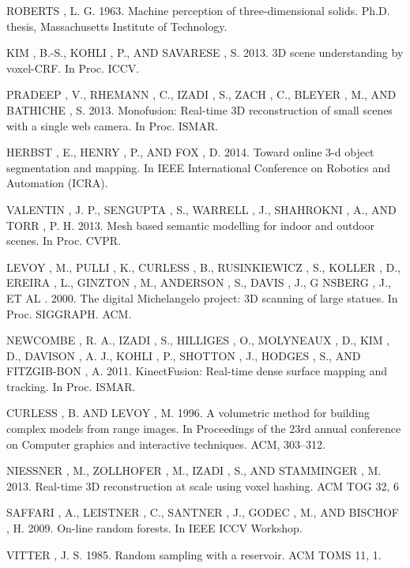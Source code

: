 \documentclass{llncs}
\begin{document}

\begin{thebibliography}{1}

  ROBERTS , L. G. 1963. Machine perception of three-dimensional solids. Ph.D. thesis, Massachusetts Institute of Technology.

  KIM , B.-S., KOHLI , P., AND SAVARESE , S. 2013. 3D scene understanding by voxel-CRF. In Proc. ICCV.

  PRADEEP , V., RHEMANN , C., IZADI , S., ZACH , C., BLEYER , M., AND BATHICHE , S. 2013. Monofusion: Real-time 3D reconstruction of small scenes with a single web camera. In Proc. ISMAR.

  HERBST , E., HENRY , P., AND FOX , D. 2014. Toward online 3-d object segmentation and mapping. In IEEE International Conference on Robotics and Automation (ICRA).

  VALENTIN , J. P., SENGUPTA , S., WARRELL , J., SHAHROKNI , A., AND TORR , P. H. 2013. Mesh based semantic modelling for indoor and outdoor scenes. In Proc. CVPR.

  LEVOY , M., PULLI , K., CURLESS , B., RUSINKIEWICZ , S., KOLLER , D., EREIRA , L., GINZTON , M., ANDERSON , S., DAVIS , J., G NSBERG , J., ET AL . 2000. The digital Michelangelo project: 3D scanning of large statues. In Proc. SIGGRAPH. ACM.

  NEWCOMBE , R. A., IZADI , S., HILLIGES , O., MOLYNEAUX , D., KIM , D., DAVISON , A. J., KOHLI , P., SHOTTON , J., HODGES , S., AND FITZGIB-BON , A. 2011. KinectFusion: Real-time dense surface mapping and tracking. In Proc. ISMAR.
  
  CURLESS , B. AND LEVOY , M. 1996. A volumetric method for building complex models from range images. In Proceedings of the 23rd annual conference on Computer graphics and interactive techniques. ACM, 303–312.
  
  NIESSNER , M., ZOLLHOFER , M., IZADI , S., AND STAMMINGER , M. 2013. Real-time 3D reconstruction at scale using voxel hashing. ACM TOG 32, 6
  
  SAFFARI , A., LEISTNER , C., SANTNER , J., GODEC , M., AND BISCHOF , H. 2009. On-line random forests. In IEEE ICCV Workshop.
  
  VITTER , J. S. 1985. Random sampling with a reservoir. ACM TOMS 11, 1.
  

\end{thebibliography}
\end{document}
